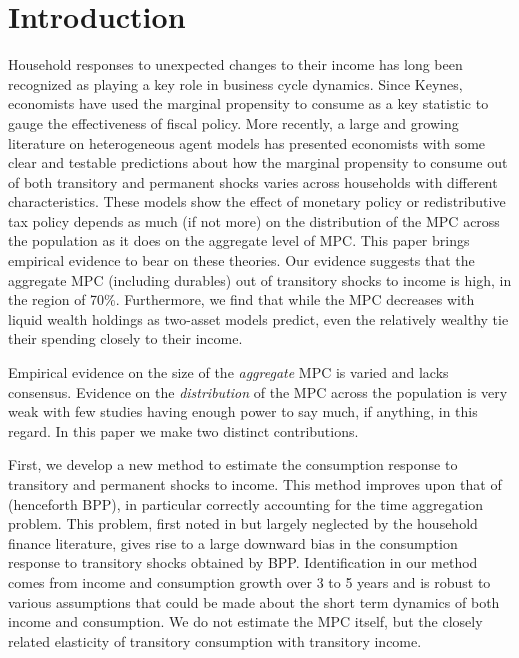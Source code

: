 \documentclass[titlepage]{\econtex}\newcommand{\texname}{IncomeUncertainty}
\begin{document}
\titlepagefinish
\setcounter{page}{1}

\pagebreak
\section{Introduction}

Household responses to unexpected changes to their income has long been recognized as playing a key role in business cycle dynamics. Since Keynes, economists have used the marginal propensity to consume as a key statistic to gauge the effectiveness of fiscal policy. More recently, a large and growing literature on heterogeneous agent models has presented economists with some clear and testable predictions about how the marginal propensity to consume out of both transitory and permanent shocks varies across households with different characteristics. These models show the effect of monetary policy or redistributive tax policy depends as much (if not more) on the distribution of the MPC across the population as it does on the aggregate level of MPC. This paper brings empirical evidence to bear on these theories. Our evidence suggests that the aggregate MPC (including durables) out of transitory shocks to income is high, in the region of 70\%. Furthermore, we find that while the MPC decreases with liquid wealth holdings as two-asset models predict, even the relatively wealthy tie their spending closely to their income.

Empirical evidence on the size of the \textit{aggregate} MPC is varied and lacks consensus. Evidence on the \textit{distribution} of the MPC across the population is very weak with few studies having enough power to say much, if anything, in this regard. In this paper we make two distinct contributions.

First, we develop a new method to estimate the consumption response to transitory and permanent shocks to income. This method improves upon that of \cite{blundell_consumption_2008} (henceforth BPP), in particular correctly accounting for the time aggregation problem. This problem, first noted in \cite{working_note_1960} but largely neglected by the household finance literature, gives rise to a large downward bias in the consumption response to transitory shocks obtained by BPP. Identification in our method comes from income and consumption growth over 3 to 5 years and is robust to various assumptions that could be made about the short term dynamics of both income and consumption. We do not estimate the MPC itself, but the closely related elasticity of transitory consumption with transitory income.
\end{document}
